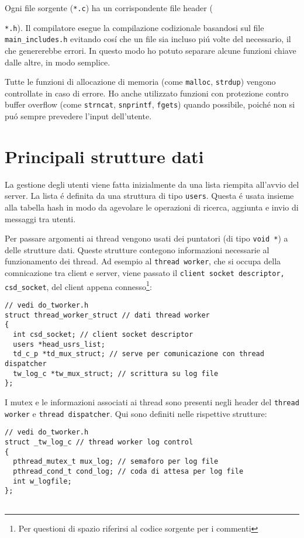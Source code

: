 \documentclass[12pt a4paper oneside]{article}
\begin{document}
			\par
			Ogni file sorgente (\texttt{*.c}) ha un corrispondente file header ({\texttt{*.h}). Il compilatore esegue la compilazione codizionale basandosi sul file \texttt{main\_includes.h} evitando cos\'i che un file sia incluso pi\'u volte del necessario, il che genererebbe errori. In questo modo ho potuto separare alcune funzioni chiave dalle altre, in modo semplice.
			\par
			Tutte le funzioni di allocazione di memoria (come \texttt{malloc}, \texttt{strdup}) vengono controllate in caso di errore. Ho anche utilizzato funzioni con protezione contro buffer overflow (come \texttt{strncat}, \texttt{snprintf}, \texttt{fgets}) quando possibile, poich\'e non si pu\'o sempre prevedere l'input dell'utente.
			\newpage
		\section{Principali strutture dati}
			\par
			La gestione degli utenti viene fatta inizialmente da una lista riempita all'avvio del server. La lista \'e definita da una struttura di tipo \texttt{users}. Questa \'e usata insieme alla tabella hash in modo da agevolare le operazioni di ricerca, aggiunta e invio di messaggi tra utenti.
			\par
			Per passare argomenti ai thread vengono usati dei puntatori  (di tipo \texttt{void *}) a delle strutture dati. Queste strutture contegono informazioni necessarie al funzionamento dei thread. Ad esempio al \texttt{thread worker}, che si occupa della comnicazione tra client e server, viene passato il \texttt{client socket descriptor, csd\_socket}, del client appena connesso\footnote{Per questioni di spazio riferirsi al codice sorgente per i commenti}:
			\begin{verbatim}
// vedi do_tworker.h
struct thread_worker_struct // dati thread worker
{
  int csd_socket; // client socket descriptor
  users *head_usrs_list;
  td_c_p *td_mux_struct; // serve per comunicazione con thread dispatcher
  tw_log_c *tw_mux_struct; // scrittura su log file
};
			\end{verbatim}
			\par
			I mutex e le informazioni associati ai thread sono presenti negli header del \texttt{thread worker} e \texttt{thread dispatcher}. Qui sono definiti nelle rispettive strutture:
			\begin{verbatim}
// vedi do_tworker.h
struct _tw_log_c // thread worker log control
{
  pthread_mutex_t mux_log; // semaforo per log file
  pthread_cond_t cond_log; // coda di attesa per log file
  int w_logfile;
};


\end{verbatim}}
\end{document}
